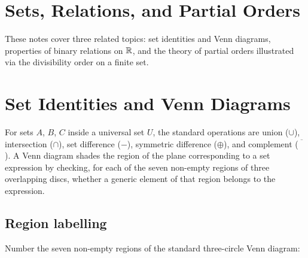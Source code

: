\section{Sets, Relations, and Partial Orders}

These notes cover three related topics: set identities and Venn diagrams,
properties of binary relations on $\mathbb{R}$, and the theory of partial orders
illustrated via the divisibility order on a finite set.

\section{Set Identities and Venn Diagrams}

For sets $A$, $B$, $C$ inside a universal set $U$, the standard operations
are union ($\cup$), intersection ($\cap$), set difference ($-$), symmetric
difference ($\oplus$), and complement ($\overline{\phantom{X}}$).  A Venn
diagram shades the region of the plane corresponding to a set expression by
checking, for each of the seven non-empty regions of three overlapping discs,
whether a generic element of that region belongs to the expression.

\subsection{Region labelling}

Number the seven non-empty regions of the standard three-circle Venn diagram:
\medskip
\begin{center}
\end{center}
\medskip

